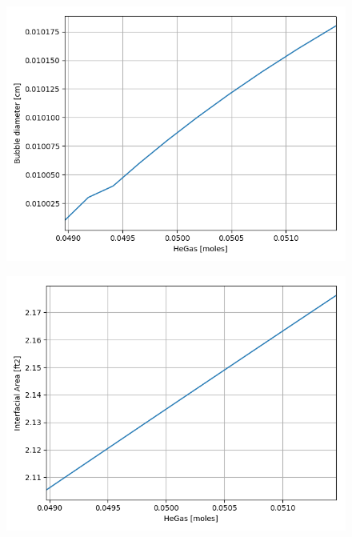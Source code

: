 \begin{figure}[p] 
\centering
\begin{minipage}{.5\textwidth}
  \centering
  \includegraphics[width=.9\linewidth]{images/BubbleDiaMassIncrease.png}
  \label{fig:mass_increase_bubDia}
\end{minipage}%
\begin{minipage}{.5\textwidth}
  \centering
  \includegraphics[width=.9\linewidth]{images/IntAreaMassIncrease.png}
  \label{fig:mass_increase_intArea}
\end{minipage}
\end{figure}

